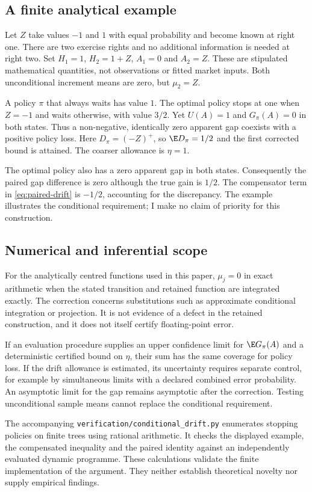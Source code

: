 \subsection{A finite analytical example}

Let $Z$ take values $-1$ and $1$ with equal probability and become known at right one. There are two exercise rights and no additional information is needed at right two. Set $H_1=1$, $H_2=1+Z$, $A_1=0$ and $A_2=Z$. These are stipulated mathematical quantities, not observations or fitted market inputs. Both unconditional increment means are zero, but $\mu_2=Z$.

A policy $\pi$ that always waits has value $1$. The optimal policy stops at one when $Z=-1$ and waits otherwise, with value $3/2$. Yet $U(A)=1$ and $G_\pi(A)=0$ in both states. Thus a non-negative, identically zero apparent gap coexists with a positive policy loss. Here $D_\pi=(-Z)^+$, so $\E D_\pi=1/2$ and the first corrected bound is attained. The coarser allowance is $\eta=1$.

The optimal policy also has a zero apparent gap in both states. Consequently the paired gap difference is zero although the true gain is $1/2$. The compensator term in \eqref{eq:paired-drift} is $-1/2$, accounting for the discrepancy. The example illustrates the conditional requirement; I make no claim of priority for this construction.

\subsection{Numerical and inferential scope}

For the analytically centred functions used in this paper, $\mu_j=0$ in exact arithmetic when the stated transition and retained function are integrated exactly. The correction concerns substitutions such as approximate conditional integration or projection. It is not evidence of a defect in the retained construction, and it does not itself certify floating-point error.

If an evaluation procedure supplies an upper confidence limit for $\E G_\pi(A)$ and a deterministic certified bound on $\eta$, their sum has the same coverage for policy loss. If the drift allowance is estimated, its uncertainty requires separate control, for example by simultaneous limits with a declared combined error probability. An asymptotic limit for the gap remains asymptotic after the correction. Testing unconditional sample means cannot replace the conditional requirement.

The accompanying \texttt{verification/conditional\_drift.py} enumerates stopping policies on finite trees using rational arithmetic. It checks the displayed example, the compensated inequality and the paired identity against an independently evaluated dynamic programme. These calculations validate the finite implementation of the argument. They neither establish theoretical novelty nor supply empirical findings.
